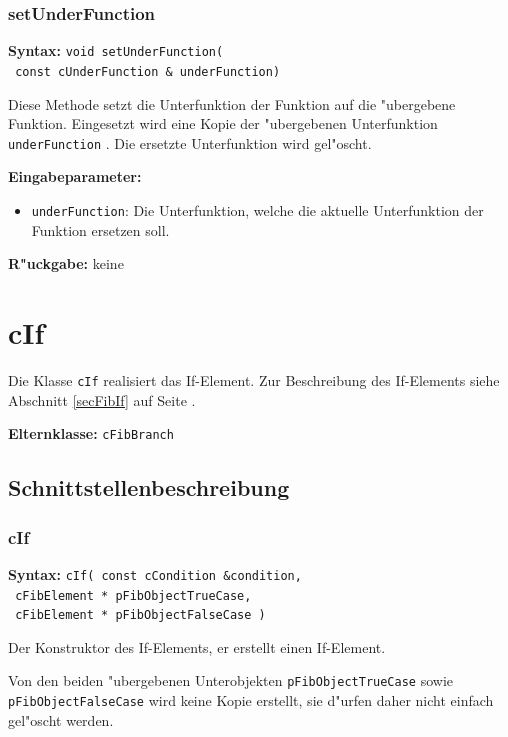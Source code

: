 \subsubsection{setUnderFunction}

\textbf{Syntax:} \verb|void setUnderFunction(| \\\verb| const cUnderFunction & underFunction)|

\bigskip\noindent
Diese Methode setzt die Unterfunktion der Funktion auf die "ubergebene Funktion. Eingesetzt wird eine Kopie der "ubergebenen Unterfunktion \verb|underFunction| . Die ersetzte Unterfunktion wird gel"oscht.

\bigskip\noindent
\textbf{Eingabeparameter:}
\begin{itemize}
 \item \verb|underFunction|: Die Unterfunktion, welche die aktuelle Unterfunktion der Funktion ersetzen soll.
\end{itemize}

\bigskip\noindent
\textbf{R"uckgabe:} keine



\section{cIf}

Die Klasse \verb|cIf| realisiert das If-Element.
Zur Beschreibung des If-Elements siehe Abschnitt \ref{secFibIf} auf Seite \pageref{secFibIf} .

\bigskip\noindent
\textbf{Elternklasse:} \verb|cFibBranch|


\subsection{Schnittstellenbeschreibung}

\subsubsection{cIf}

\textbf{Syntax:} \verb|cIf( const cCondition &condition,| \\\verb| cFibElement * pFibObjectTrueCase,| \\\verb| cFibElement * pFibObjectFalseCase )|

\bigskip\noindent
Der Konstruktor des If-Elements, er erstellt einen If-Element.

Von den beiden "ubergebenen Unterobjekten \verb|pFibObjectTrueCase| sowie \verb|pFibObjectFalseCase| wird keine Kopie erstellt, sie d"urfen daher nicht einfach gel"oscht werden.

